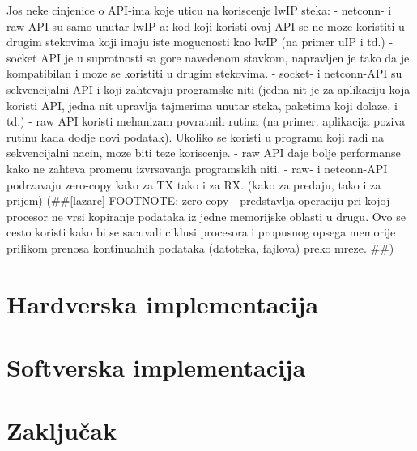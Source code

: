 \documentclass[a4paper,12pt, master]{etf}
\begin{document}
	Jos neke cinjenice o API-ima koje uticu na koriscenje lwIP steka:
	- netconn- i raw-API su samo unutar lwIP-a: kod koji koristi ovaj API se ne moze koristiti u
	drugim stekovima koji imaju iste mogucnosti kao lwIP (na primer uIP i td.)
	- socket API je u suprotnosti sa gore navedenom stavkom, napravljen je tako da je kompatibilan
	i moze se koristiti u drugim stekovima.
	- socket- i netconn-API su sekvencijalni API-i koji zahtevaju programske niti (jedna nit je za
	aplikaciju koja koristi API, jedna nit upravlja tajmerima unutar steka, paketima koji dolaze, i
	td.)
	- raw API koristi mehanizam povratnih rutina (na primer. aplikacija poziva rutinu kada dodje
	novi podatak). Ukoliko se koristi u programu koji radi na sekvencijalni nacin, moze biti teze
	koriscenje.
	- raw API daje bolje performanse kako ne zahteva promenu izvrsavanja programskih niti.
	- raw- i netconn-API podrzavaju zero-copy kako za TX tako i za RX. (kako za predaju, tako i za
	prijem) (\#\#[lazarc] FOOTNOTE: zero-copy - predstavlja operaciju pri kojoj procesor ne vrsi
	kopiranje podataka iz jedne memorijske oblasti u drugu. Ovo se cesto koristi kako bi se
	sacuvali ciklusi procesora i propusnog opsega memorije prilikom prenosa kontinualnih podataka
	(datoteka, fajlova) preko mreze. \#\#)

	\newpage

	\chapter{Hardverska implementacija}

	\newpage

	\chapter{Softverska implementacija}

	\newpage

	\chapter{Zaključak}

	\newpage
\end{document}
